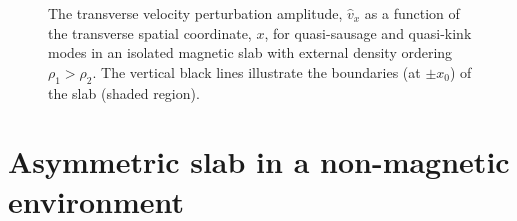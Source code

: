 \begin{figure}
{{{
				\label{fig: body quasi-saus}}}}
	\caption{The transverse velocity perturbation amplitude, $\widehat{v}_x$ as a function of the transverse spatial coordinate, $x$, for quasi-sausage and quasi-kink modes in an isolated magnetic slab with external density ordering $\rho_1 > \rho_2$. The vertical black lines illustrate the boundaries (at $\pm x_0$) of the slab (shaded region).}
\end{figure}


\section{Asymmetric slab in a non-magnetic environment}
\label{sec: EVP non-mag}

